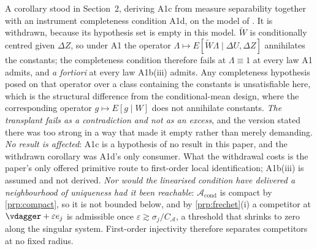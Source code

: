\begin{remark}\label{rem:a1cwithdrawn}
A corollary stood in Section~2, deriving A1c from measure separability together with an instrument
completeness condition A1d, on the model of \citet[Prop.~2.2]{feve2014}. It is withdrawn,
because its hypothesis set is empty in this model. $\widetilde W$ is conditionally centred given
$\Delta Z$, so under A1 the operator $\Lambda\mapsto E[\widetilde W\Lambda\mid\Delta U,\Delta Z]$
annihilates the constants; the completeness condition therefore fails at $\Lambda\equiv1$ at every
law A1 admits, and \emph{a fortiori} at every law A1b(iii) admits. Any completeness hypothesis posed
on that operator over a class containing the constants is unsatisfiable here, which is the structural
difference from the conditional-mean design, where the corresponding operator $g\mapsto E[g\mid W]$
does not annihilate constants. \emph{The transplant fails as a contradiction and not as an excess},
and the version stated there was too strong in a way that made it empty rather than merely demanding.
\emph{No result is affected}: A1c is a hypothesis of no result in this paper, and the withdrawn
corollary was A1d's only consumer. What the withdrawal costs is the paper's only offered primitive
route to first-order local identification; A1b(iii) is assumed and not derived. \emph{Nor would the
linearised condition have delivered a neighbourhood of uniqueness had it been reachable}:
$\mathcal A_{\mathrm{cond}}$ is compact by \cref{prp:compact}, so it is not bounded below, and by
\cref{prp:frechet}\textup{(i)} a competitor at $\vdagger+\varepsilon e_j$ is admissible once
$\varepsilon\gtrsim\sigma_j/C_{\mathcal A}$, a threshold that shrinks to zero along the singular
system. First-order injectivity therefore separates competitors at no fixed radius.
\end{remark}

